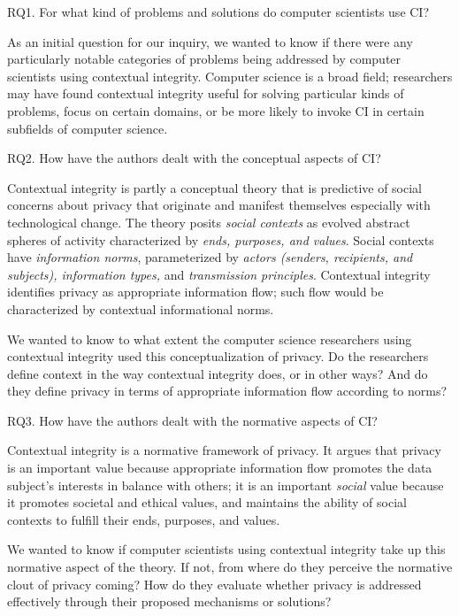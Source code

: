 \documentclass[../thesis.tex]{subfiles}
\begin{document}
{\color[rgb]{0.2627451,0.2627451,0.2627451}
RQ1. For what kind of problems and solutions do computer scientists use
CI?}

As an initial question for our inquiry, we wanted to know if there were
any particularly notable categories of problems being addressed by
computer scientists using contextual integrity. Computer science is a
broad field; researchers may have found contextual integrity useful for
solving particular kinds of problems, focus on certain domains, or be
more likely to invoke CI in certain subfields of computer science.

{\color[rgb]{0.2627451,0.2627451,0.2627451}
RQ2. How have the authors dealt with the conceptual aspects of CI?}


\bigskip

Contextual integrity is partly a conceptual theory that is predictive of
social concerns about privacy that originate and manifest themselves
especially with technological change. The theory posits \textit{social
contexts} as evolved abstract spheres of activity characterized by
\textit{ends, purposes, and values}. Social contexts have
\textit{information norms}, parameterized by \textit{actors (senders,
recipients, and subjects), information types, }and\textit{ transmission
principles}. Contextual integrity identifies privacy as appropriate
information flow; such flow would be characterized by contextual
informational norms.


\bigskip

We wanted to know to what extent the computer science researchers using
contextual integrity used this conceptualization of privacy. Do the
researchers define context in the way contextual integrity does, or in
other ways? And do they define privacy in terms of appropriate
information flow according to norms?

{\color[rgb]{0.2627451,0.2627451,0.2627451}
RQ3. How have the authors dealt with the normative aspects of CI?}

\textcolor[rgb]{0.2,0.2,0.2}{Contextual integrity is a normative
framework of privacy. It argues that privacy is an important value
because appropriate information flow promotes the data
subject's interests in balance with others; it is an
important
}\textit{\textcolor[rgb]{0.2,0.2,0.2}{social}}\textcolor[rgb]{0.2,0.2,0.2}{
value because it promotes societal and ethical values, and maintains
the ability of social contexts to fulfill their ends, purposes, and
values.}

\textcolor[rgb]{0.2,0.2,0.2}{We wanted to know if computer scientists
using contextual integrity take up this normative aspect of the theory.
If not, from where do they perceive the normative clout of privacy
coming? How do they evaluate whether privacy is addressed effectively
through their proposed mechanisms or solutions?}
\end{document}
